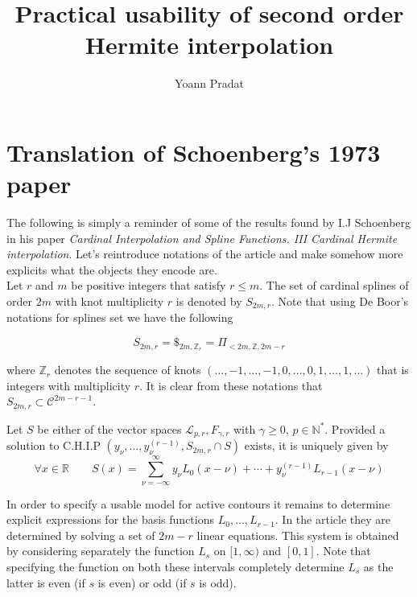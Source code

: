 \documentclass[a4paper, 11pt]{article}
\begin{document}
\title{Practical usability of second order Hermite interpolation}
\author{Yoann Pradat}
\maketitle
\tableofcontents

\section{Translation of Schoenberg's 1973 paper}

The following is simply a reminder of some of the results found by I.J Schoenberg in his paper \emph{Cardinal 
Interpolation and Spline Functions. III Cardinal Hermite interpolation}. Let's reintroduce notations of the article and 
make somehow more explicits what the objects they encode are. \\

Let $r$ and $m$ be positive integers that satisfy $r \leq m$. The set of cardinal splines of order $2m$ with knot 
multiplicity $r$ is denoted by $S_{2m,r}$. Note that using De Boor's notations for splines set we have the following

\begin{equation}
  S_{2m,r} = \$_{2m, \mathbb{Z}_r} = \Pi_{< 2m, \mathbb{Z}, 2m-r}
\end{equation}

where $\mathbb{Z}_{r}$ denotes the sequence of knots $(\dots, -1,\dots,-1, 0, \dots, 0, 1, \dots, 1, \dots)$ that is 
integers with multiplicity $r$. It is clear from these notations that $S_{2m, r} \subset \mathcal{C}^{2m-r-1}$. 

\begin{thm}{1}
  Let $S$ be either of the vector spaces $\mathcal{L}_{p,r}, F_{\gamma,r}$ with $\gamma \geq 0$, $p \in \mathbb{N}^*$.  
  Provided a solution to C.H.I.P $\left( y_{\nu}, \dots,  y_{\nu}^{(r-1)}, S_{2m,r} \cap S \right)$ exists, it is 
  uniquely given by
  \begin{equation}
    \forall x \in \mathbb{R} \qquad S(x) = \sum_{\nu = - \infty}^{\infty} y_{\nu} L_0(x-\nu) + \cdots + y_{\nu}^{(r-1)} 
    L_{r-1}(x-\nu)
  \end{equation}
\end{thm}

In order to specify a usable model for active contours it remains to determine explicit expressions for the basis 
functions $L_0, \dots, L_{r-1}$. In the article they are determined by solving a set of $2m-r$ linear equations. This 
system is obtained by considering separately the function $L_s$ on $[1, \infty)$ and $[0,1]$. Note that specifying the 
function on both these intervals completely determine $L_s$ as the latter is even (if $s$ is even) or odd (if $s$ is 
odd). \\  
\end{document}

